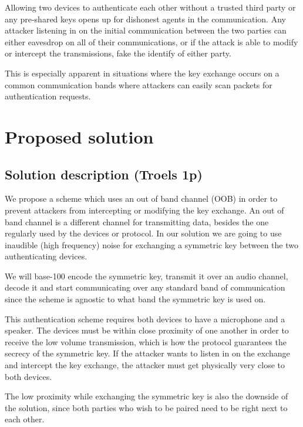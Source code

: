 \documentclass[12pt]{article}
\begin{document}
Allowing two devices to authenticate each other without a trusted third party or any pre-shared keys opens up for dishonest agents in the communication. Any attacker listening in on the initial communication between the two parties can either eavesdrop on all of their communications, or if the attack is able to modify or intercept the transmissions, fake the identify of either party.

This is especially apparent in situations where the key exchange occurs on a common communication bands where attackers can easily scan packets for authentication requests.

\newpage

\section{Proposed solution}
\label{sec:Proposed solution}

\subsection{Solution description (Troels 1p)}
\label{sub:Solution description}

We propose a scheme which uses an out of band channel (OOB) in order to prevent attackers from intercepting or modifying the key exchange. An out of band channel is a different channel for transmitting data, besides the one regularly used by the devices or protocol. In our solution we are going to use inaudible (high frequency) noise for exchanging a symmetric key between the two authenticating devices.

We will base-100 encode the symmetric key, transmit it over an audio channel, decode it and start communicating over any standard band of communication since the scheme is agnostic to what band the symmetric key is used on.

This authentication scheme requires both devices to have a microphone and a speaker.
The devices must be within close proximity of one another in order to receive the low volume transmission, which is how the protocol guarantees the secrecy of the symmetric key. If the attacker wants to listen in on the exchange and intercept the key exchange, the attacker must get physically very close to both devices.

The low proximity while exchanging the symmetric key is also the downside of the solution, since both parties who wish to be paired need to be right next to each other.
\end{document}
